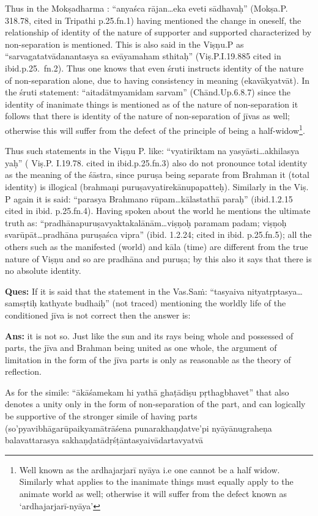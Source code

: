 Thus in the Mokṣadharma : “anyaśca rājan…eka eveti sādhavaḥ” (Mokṣa.P. 318.78, cited in Tripathi p.25.fn.1)  having mentioned the change in oneself, the relationship of identity of the nature of supporter and supported characterized by non-separation is mentioned.  This is also said in the Viṣṇu.P as “sarvagatatvādanantasya sa evāyamaham sthitaḥ” (Viṣ.P.I.19.885 cited in ibid.p.25.~fn.2).   Thus one knows that even śruti instructs identity of the nature of non-separation alone, due to having consistency in meaning (ekavākyatvāt). In the śruti statement: “aitadātmyamidam sarvam” (Chānd.Up.6.8.7) since the identity of inanimate things is mentioned as of the nature of non-separation it follows that there is identity of the nature of non-separation of jīvas as well; otherwise this will suffer from the defect of the principle of being a half-widow\footnote{Well known as the ardhajarjarī nyāya i.e one cannot be a half widow. Similarly what applies to the inanimate things must equally apply to the animate world as well; otherwise it will suffer from the defect known as ‘ardhajarjarī-nyāya’}. 

Thus such statements in the Viṣṇu P. like: “vyatiriktam na yasyāsti…akhilasya yaḥ” ( Viṣ.P. I.19.78. cited in ibid.p.25.fn.3) also do not pronounce total identity as the meaning of the śāstra, since puruṣa being separate from Brahman it (total identity) is illogical (brahmaṇi puruṣavyatirekānupapatteḥ). Similarly in the Viṣ. P again it is said: “parasya Brahmano rūpam…kālastathā paraḥ” (ibid.1.2.15 cited in ibid. p.25.fn.4). Having spoken about the world he mentions the ultimate truth as: “pradhānapuruṣavyaktakalānām…viṣṇoḥ paramam padam; viṣṇoḥ svarūpāt…pradhāna puruṣaśca vipra” (ibid. 1.2.24; cited in ibid. p.25.fn.5); all the others such as the manifested (world) and kāla (time) are different from the true nature of Viṣṇu and so are pradhāna and puruṣa; by this also it says that there is no absolute identity. 

\textbf{Ques:} If it is said that the statement in the Vas.Saṁ: “tasyaiva nityatṛptasya…samsṛtiḥ kathyate budhaiḥ” (not traced) mentioning the worldly life of the conditioned jīva is not correct then the answer is: 

\textbf{Ans:} it is not so. Just like the sun and its rays being whole and possessed of parts, the jīva and Brahman being united as one whole, the argument of limitation in the form of the jīva parts is only as reasonable as the theory of reflection.

As for the simile: “ākāśamekam hi yathā ghaṭādiṣu pṛthagbhavet” that also denotes a unity only in the form of non-separation of the part, and can logically be supportive of the stronger simile of having parts (so’pyavibhāgarūpaikyamātrāśena punarakhaṇḍatve’pi nyāyānugra\-heṇa balavattarasya sakhaṇḍatādṛśṭāntasyaivādartavyatvā

